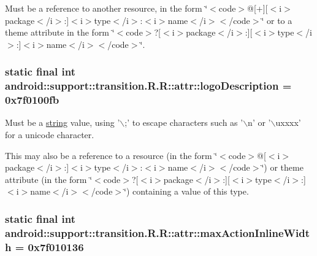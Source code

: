 Must be a reference to another resource, in the form \char`\"{}$<$code$>$@\mbox{[}+\mbox{]}\mbox{[}$<$i$>$package$<$/i$>$:\mbox{]}$<$i$>$type$<$/i$>$:$<$i$>$name$<$/i$>$$<$/code$>$\char`\"{} or to a theme attribute in the form \char`\"{}$<$code$>$?\mbox{[}$<$i$>$package$<$/i$>$:\mbox{]}\mbox{[}$<$i$>$type$<$/i$>$:\mbox{]}$<$i$>$name$<$/i$>$$<$/code$>$\char`\"{}. \hypertarget{classandroid_1_1support_1_1transition_1_1_r_1_1attr_6bb7fc1f23f16580c4ce7df401417ab8}{
\subsubsection[{logoDescription}]{\setlength{\rightskip}{0pt plus 5cm}static final int android::support::transition.R.R::attr::logoDescription = 0x7f0100fb}}
\label{classandroid_1_1support_1_1transition_1_1_r_1_1attr_6bb7fc1f23f16580c4ce7df401417ab8}


Must be a \hyperlink{classandroid_1_1support_1_1transition_1_1_r_1_1string}{string} value, using '$\backslash$;' to escape characters such as '$\backslash$n' or '$\backslash$uxxxx' for a unicode character. 

This may also be a reference to a resource (in the form \char`\"{}$<$code$>$@\mbox{[}$<$i$>$package$<$/i$>$:\mbox{]}$<$i$>$type$<$/i$>$:$<$i$>$name$<$/i$>$$<$/code$>$\char`\"{}) or theme attribute (in the form \char`\"{}$<$code$>$?\mbox{[}$<$i$>$package$<$/i$>$:\mbox{]}\mbox{[}$<$i$>$type$<$/i$>$:\mbox{]}$<$i$>$name$<$/i$>$$<$/code$>$\char`\"{}) containing a value of this type. \hypertarget{classandroid_1_1support_1_1transition_1_1_r_1_1attr_09510d342ddc2fbd5d4106bf48843c45}{
\subsubsection[{maxActionInlineWidth}]{\setlength{\rightskip}{0pt plus 5cm}static final int android::support::transition.R.R::attr::maxActionInlineWidth = 0x7f010136}}
\label{classandroid_1_1support_1_1transition_1_1_r_1_1attr_09510d342ddc2fbd5d4106bf48843c45}


